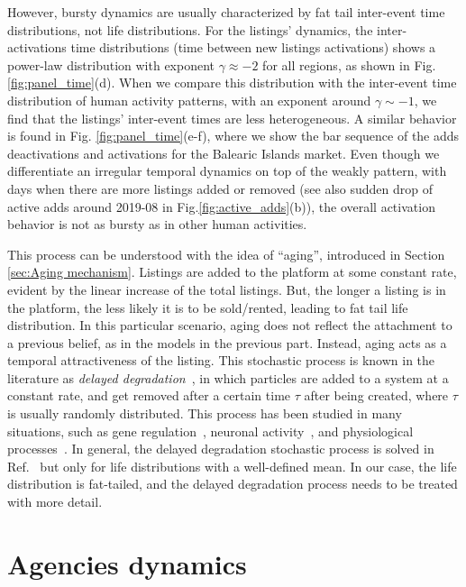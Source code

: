 However, bursty dynamics are usually characterized by fat tail inter-event time distributions, not life distributions. For the listings' dynamics, the inter-activations time distributions (time between new listings activations) shows a power-law distribution with exponent $\gamma \approx -2$ for all regions, as shown in Fig. \ref{fig:panel_time}(d). When we compare this distribution with the inter-event time distribution of human activity patterns, with an exponent around $\gamma \sim -1$, we find that the listings' inter-event times are less heterogeneous. A similar behavior is found in Fig. \ref{fig:panel_time}(e-f), where we show the bar sequence of the adds deactivations and activations for the Balearic Islands market. Even though we differentiate an irregular temporal dynamics on top of the weakly pattern, with days when there are more listings added or removed (see also sudden drop of active adds around 2019-08 in Fig.\ref{fig:active_adds}(b)), the overall activation behavior is not as bursty as in other human activities.

This process can be understood with the idea of ``aging'', introduced in Section \ref{sec:Aging mechanism}. Listings are added to the platform at some constant rate, evident by the linear increase of the total listings. But, the longer a listing is in the platform, the less likely it is to be sold/rented, leading to fat tail life distribution. In this particular scenario, aging does not reflect the attachment to a previous belief, as in the models in the previous part. Instead, aging acts as a temporal attractiveness of the listing. This stochastic process is known in the literature as \textit{delayed degradation}~\cite{lafuerza2013stochastic}, in which particles are added to a system at a constant rate, and get removed after a certain time $\tau$ after being created, where $\tau$ is usually randomly distributed. This process has been studied in many situations, such as gene regulation~\cite{lewis2003autoinhibition, barrio2006oscillatory, bratsun2005delay}, neuronal activity~\cite{flunkert2013dynamics}, and physiological processes~\cite{longtin1990noise}. In general, the delayed degradation stochastic process is solved in Ref.~\cite{lafuerza2013stochastic} but only for life distributions with a well-defined mean. In our case, the life distribution is fat-tailed, and the delayed degradation process needs to be treated with more detail.

\section{Agencies dynamics}

